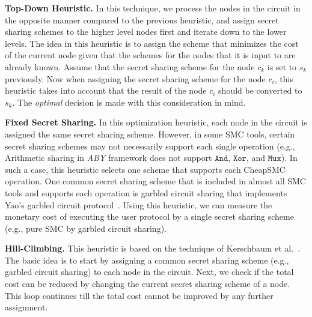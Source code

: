 \documentclass{llncs}
\newcommand{\sysname}{{CheapSMC}\xspace}
\begin{document}
\textbf{Top-Down Heuristic.} In this technique, we process the nodes in the circuit in the opposite manner compared to the previous heuristic, and assign secret sharing schemes to the higher level nodes first and iterate down to the lower levels. The idea in this heuristic is to assign the scheme that minimizes the cost of the current node given that the schemes for the nodes that it is input to are already known. Assume that the secret sharing scheme for the node $c_k$ is set to $s_k$ previously. Now when assigning the secret sharing scheme for the node $c_i$, this heuristic takes into account that the result of the node $c_i$ should be converted to $s_k$. The \emph{optimal} decision is made with this consideration in mind. 

\textbf{Fixed Secret Sharing.} In this optimization heuristic, each node in the circuit is assigned the same secret sharing scheme. However, in some SMC tools, certain secret sharing schemes may not necessarily support each single operation (e.g., Arithmetic sharing in \emph{ABY} framework does not support $\mathtt{And}$, $\mathtt{Xor}$, and $\mathtt{Mux}$). In such a case, this heuristic selects one scheme that supports each \sysname operation. One common secret sharing scheme that is included in almost all SMC tools and supports each operation is garbled circuit sharing that implements Yao's garbled circuit protocol~\cite{cite:yao1982protocols}. Using this heuristic, we can measure the monetary cost of executing the user protocol by a single secret sharing scheme (e.g., pure SMC by garbled circuit sharing).

\textbf{Hill-Climbing.} This heuristic is based on the technique of Kerschbaum et al.~\cite{cite:kerschbaum2014automatic}. The basic idea is to start by assigning a common secret sharing scheme (e.g., garbled circuit sharing) to each node in the circuit. Next, we check if the total cost can be reduced by changing the current secret sharing scheme of a node. This loop continues till the total cost cannot be improved by any further assignment. 
\end{document}
